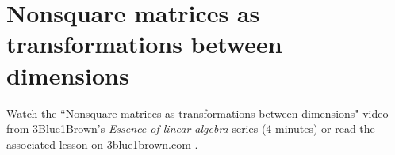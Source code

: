 \section{Nonsquare matrices as transformations between dimensions}

Watch the ``Nonsquare matrices as transformations between dimensions" video from
3Blue1Brown's \textit{Essence of linear algebra} series (4 minutes) or read the
associated lesson on 3blue1brown.com
\cite{bib:3b1b_linalg_nonsquare_matrices_as_transformations_between_dimensions}.
